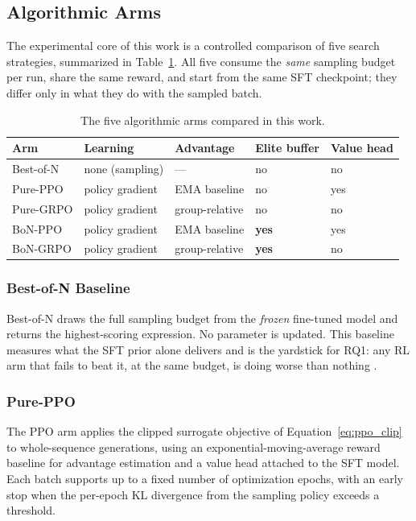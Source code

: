 \subsection{Algorithmic Arms}
\label{sec:algorithms}

The experimental core of this work is a controlled comparison of five search strategies, summarized in Table~\ref{tab:rl_algorithms}. All five consume the \emph{same} sampling budget per run, share the same reward, and start from the same SFT checkpoint; they differ only in what they do with the sampled batch.

\begin{table}[htbp]
    \centering
    \caption{The five algorithmic arms compared in this work.}
    \label{tab:rl_algorithms}
    \begin{tabular}{lllll}
    \toprule
    \textbf{Arm} & \textbf{Learning} & \textbf{Advantage} & \textbf{Elite buffer} & \textbf{Value head} \\
    \midrule
    Best-of-N & none (sampling) & --- & no & no \\
    Pure-PPO & policy gradient & EMA baseline & no & yes \\
    Pure-GRPO & policy gradient & group-relative & no & no \\
    BoN-PPO & policy gradient & EMA baseline & \textbf{yes} & yes \\
    BoN-GRPO & policy gradient & group-relative & \textbf{yes} & no \\
    \bottomrule
    \end{tabular}
\end{table}

\subsubsection{Best-of-N Baseline}

Best-of-N draws the full sampling budget from the \emph{frozen} fine-tuned model and returns the highest-scoring expression. No parameter is updated. This baseline measures what the SFT prior alone delivers and is the yardstick for RQ1: any RL arm that fails to beat it, at the same budget, is doing worse than nothing \cite{stiennon2020learning}.

\subsubsection{Pure-PPO}

The PPO arm applies the clipped surrogate objective of Equation~\ref{eq:ppo_clip} to whole-sequence generations, using an exponential-moving-average reward baseline for advantage estimation and a value head attached to the SFT model. Each batch supports up to a fixed number of optimization epochs, with an early stop when the per-epoch KL divergence from the sampling policy exceeds a threshold.

